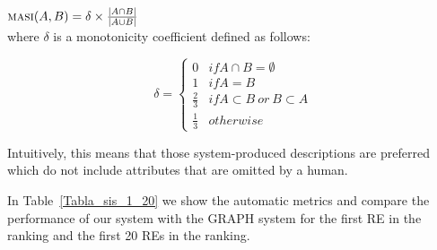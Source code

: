 $\textsc{masi}(A,B) = \delta \times \frac{|A \cap B|}{|A \cup B|}$ \\


where $\delta$ is a monotonicity coefficient defined as follows:


 \begin{equation}
     \delta  = \left\{
	       \begin{array}{ll}
		 0      & if A \cap B = \emptyset \\
		 1 & if A = B  \\
		 \frac{2}{3}     & if A \subset B~or~B \subset A\\
		 \frac{1}{3}     & otherwise
	       \end{array}
	     \right.
 \end{equation}


Intuitively, this
means that those system-produced descriptions are
preferred which do not include attributes that are
omitted by a human.  

In Table~\ref{Tabla_sis_1_20} we show the automatic metrics and compare the performance of our system  with the GRAPH system for the first RE in the ranking and the first 20 REs in the ranking. 

